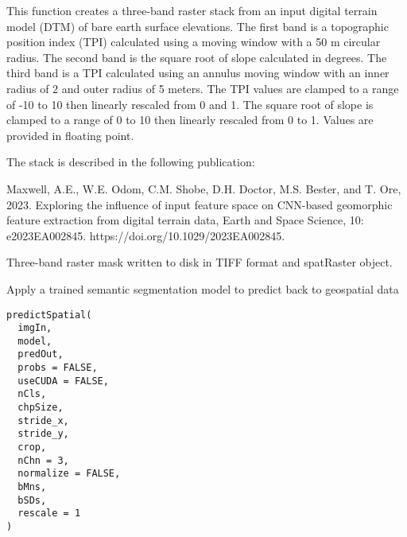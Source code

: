 \documentclass[a4paper]{book}
\begin{document}
\begin{Details}\relax
This function creates a three-band raster stack from an input digital terrain
model (DTM) of bare earth surface elevations. The first band is a topographic
position index (TPI) calculated using a moving window with a 50 m circular radius.
The second band is the square root of slope calculated in degrees. The third band
is a TPI calculated using an annulus moving window with an inner radius of 2
and outer radius of 5 meters. The TPI values are clamped to a range of -10 to 10
then linearly rescaled from 0 and 1. The square root of slope is clamped to a
range of 0 to 10 then  linearly rescaled from 0 to 1. Values are provided in
floating point.

The stack is described in the following publication:

Maxwell, A.E., W.E. Odom, C.M. Shobe, D.H. Doctor, M.S. Bester, and T. Ore,
2023. Exploring the influence of input feature space on CNN-based geomorphic
feature extraction from digital terrain data, Earth and Space Science,
10: e2023EA002845. https://doi.org/10.1029/2023EA002845.
\end{Details}
%
\begin{Value}
Three-band raster mask written to disk in TIFF format and spatRaster object.
\end{Value}
%
\begin{Description}\relax
Apply a trained semantic segmentation model to predict back to geospatial data
\end{Description}
%
\begin{Usage}
\begin{verbatim}
predictSpatial(
  imgIn,
  model,
  predOut,
  probs = FALSE,
  useCUDA = FALSE,
  nCls,
  chpSize,
  stride_x,
  stride_y,
  crop,
  nChn = 3,
  normalize = FALSE,
  bMns,
  bSDs,
  rescale = 1
)
\end{verbatim}
\end{Usage}
%
\end{document}
